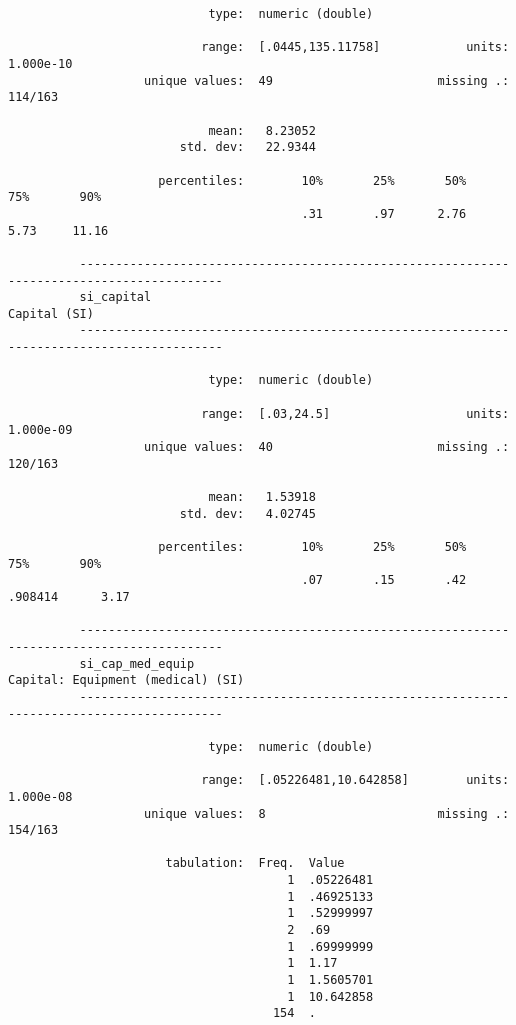 \documentclass{article}
\begin{document}
\begin{verbatim}
                            type:  numeric (double)
          
                           range:  [.0445,135.11758]            units:  1.000e-10
                   unique values:  49                       missing .:  114/163
          
                            mean:   8.23052
                        std. dev:   22.9344
          
                     percentiles:        10%       25%       50%       75%       90%
                                         .31       .97      2.76      5.73     11.16
          
          ------------------------------------------------------------------------------------------
          si_capital                                                                    Capital (SI)
          ------------------------------------------------------------------------------------------
          
                            type:  numeric (double)
          
                           range:  [.03,24.5]                   units:  1.000e-09
                   unique values:  40                       missing .:  120/163
          
                            mean:   1.53918
                        std. dev:   4.02745
          
                     percentiles:        10%       25%       50%       75%       90%
                                         .07       .15       .42   .908414      3.17
          
          ------------------------------------------------------------------------------------------
          si_cap_med_equip                                         Capital: Equipment (medical) (SI)
          ------------------------------------------------------------------------------------------
          
                            type:  numeric (double)
          
                           range:  [.05226481,10.642858]        units:  1.000e-08
                   unique values:  8                        missing .:  154/163
          
                      tabulation:  Freq.  Value
                                       1  .05226481
                                       1  .46925133
                                       1  .52999997
                                       2  .69
                                       1  .69999999
                                       1  1.17
                                       1  1.5605701
                                       1  10.642858
                                     154  .
          

\end{verbatim}
\end{document}
